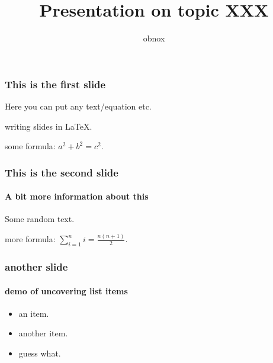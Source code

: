 \documentclass[10pt]{beamer}
\title{Presentation on  topic XXX}
\author{obnox}
\begin{document}
    \maketitle
    \begin{frame}
	    \frametitle{This is the first slide}
		Here you can put any text/equation etc. 

        writing slides in \LaTeX.

        some formula: $a^2 + b^2 = c^2$.


    \end{frame}
	\begin{frame}
		\frametitle{This is the second slide}
		\framesubtitle{A bit more information about this}
		Some random text.		

        more formula: $\sum_{i=1}^{n}i = \frac{n(n+1)}{2}$.

    \end{frame}
    \begin{frame}
        \frametitle{another slide}
        \framesubtitle{demo of uncovering list items}
        \begin{itemize}
          \item<1> an item.
          \item<2> another item.
          \item<3> guess what.
        \end{itemize}
    \end{frame}
\end{document}
